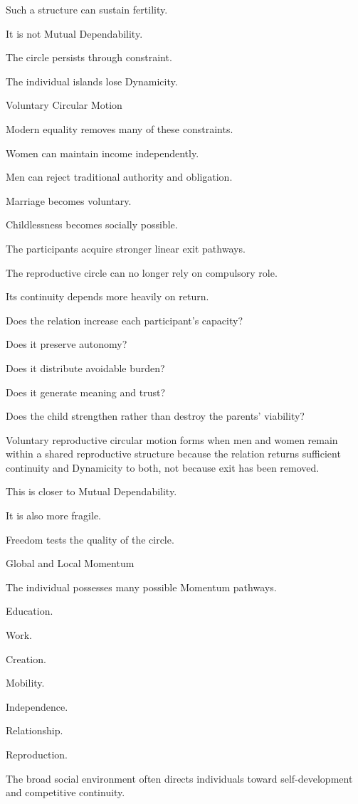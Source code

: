 Such a structure can sustain fertility.

It is not Mutual Dependability.

The circle persists through constraint.

The individual islands lose Dynamicity.

Voluntary Circular Motion

Modern equality removes many of these constraints.

Women can maintain income independently.

Men can reject traditional authority and obligation.

Marriage becomes voluntary.

Childlessness becomes socially possible.

The participants acquire stronger linear exit pathways.

The reproductive circle can no longer rely on compulsory role.

Its continuity depends more heavily on return.

Does the relation increase each participant’s capacity?

Does it preserve autonomy?

Does it distribute avoidable burden?

Does it generate meaning and trust?

Does the child strengthen rather than destroy the parents’ viability?

Voluntary reproductive circular motion forms when men and women remain within a shared reproductive structure because the relation returns sufficient continuity and Dynamicity to both, not because exit has been removed.

This is closer to Mutual Dependability.

It is also more fragile.

Freedom tests the quality of the circle.

Global and Local Momentum

The individual possesses many possible Momentum pathways.

Education.

Work.

Creation.

Mobility.

Independence.

Relationship.

Reproduction.

The broad social environment often directs individuals toward self-development and competitive continuity.

